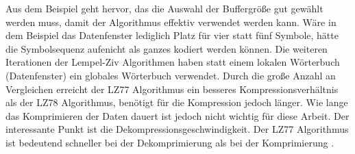 Aus dem Beispiel geht hervor, das die Auswahl der Buffergröße gut gewählt werden muss, damit der Algorithmus effektiv verwendet werden kann.
Wäre in dem Beispiel das Datenfenster lediglich Platz für vier statt fünf Symbole, hätte die Symbolsequenz \glqq aufe\grqq nicht als ganzes kodiert werden können.
Die weiteren Iterationen der Lempel-Ziv Algorithmen haben statt einem lokalen Wörterbuch (Datenfenster) ein globales Wörterbuch verwendet.
Durch die große Anzahl an Vergleichen erreicht der LZ77 Algorithmus ein besseres Kompressionsverhältnis als der LZ78 Algorithmus, benötigt für die Kompression jedoch länger.
Wie lange das Komprimieren der Daten dauert ist jedoch nicht wichtig für diese Arbeit.
Der interessante Punkt ist die Dekompressionsgeschwindigkeit.
Der LZ77 Algorithmus ist bedeutend schneller bei der Dekomprimierung als bei der Komprimierung \cite{Choudhary2015}. \newpage

